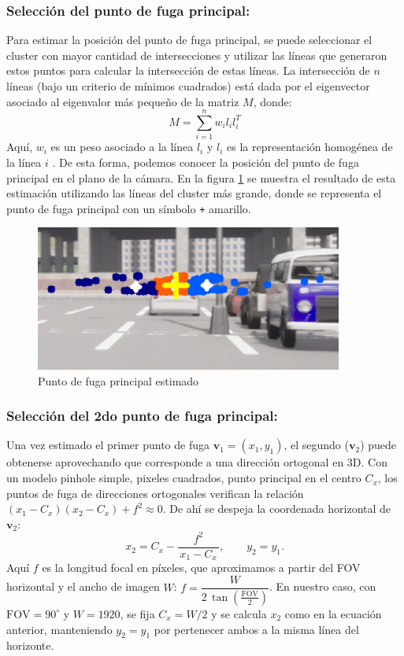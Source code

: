 \subsubsection{Selección del punto de fuga principal:}
\noindent
Para estimar la posición del punto de fuga principal, se puede seleccionar el cluster con mayor cantidad de intersecciones y
utilizar las líneas que generaron estos puntos para calcular la intersección de estas líneas.
La intersección de $n$ líneas (bajo un criterio de mínimos cuadrados) está dada por
el eigenvector asociado al eigenvalor más pequeño de la matriz $M$, donde:
\[
    M = \sum_{i=1}^{n} w_i l_i l_i^T
\]
Aquí, $w_i$ es un peso asociado a la línea $l_i$ y $l_i$ es la representación homogénea de la línea $i$ \cite{kanatani1998statistical}.
De esta forma, podemos conocer la posición del punto de fuga principal en el plano de la cámara.
En la figura \ref{fig:vanishingPoint} se muestra el resultado de esta estimación utilizando las líneas del cluster más grande, donde se
representa el punto de fuga principal con un símbolo \texttt{+} amarillo.
\begin{figure}[!ht]
    \centering
    \includegraphics[width=0.9\textwidth]{img/reticule/vanishingPoint}
    \caption{Punto de fuga principal estimado}
    \label{fig:vanishingPoint}
\end{figure}

\subsubsection{Selección del 2do punto de fuga principal:}
\noindent
Una vez estimado el primer punto de fuga \(\mathbf{v}_1=(x_1,y_1)\), el segundo (\(\mathbf{v}_2\)) puede obtenerse
aprovechando que corresponde a una dirección ortogonal en 3D. Con un modelo pinhole simple, pixeles cuadrados, punto principal
en el centro \(C_x\), los puntos de fuga de direcciones ortogonales verifican la relación
\( (x_1-C_x)(x_2-C_x) + f^2 \approx 0 \). De ahí se despeja la coordenada horizontal de \(\mathbf{v}_2\):
\begin{equation}
    x_2 = C_x - \frac{f^2}{\,x_1 - C_x\,}, \qquad y_2 = y_1.
\end{equation}
Aquí \(f\) es la longitud focal en píxeles, que aproximamos a partir del FOV horizontal y el ancho de imagen \(W\):
\( f = \dfrac{W}{2\,\tan(\tfrac{\text{FOV}}{2})} \). En nuestro caso, con \(\text{FOV}=90^\circ\) y \(W=1920\), se fija
\(C_x=W/2\) y se calcula \(x_2\) como en la ecuación anterior, manteniendo \(y_2=y_1\) por pertenecer ambos a la misma línea del horizonte.

